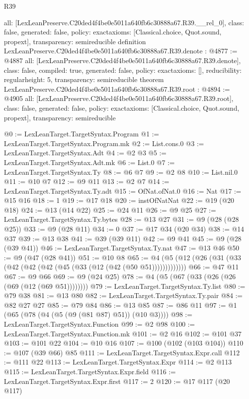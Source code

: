 \begin{lexlean}{R39}
\begin{coremodule}
{  all: [LexLeanPreserve.C20ded4f4be0e5011a640fb6c30888a67.R39.__rel_0],
  class: false,
  generated: false,
  policy: exact{axioms: [Classical.choice, Quot.sound, propext]},
  transparency: semireducible
}
definition LexLeanPreserve.C20ded4f4be0e5011a640fb6c30888a67.R39.denote : @4877 := @4887 {
  all: [LexLeanPreserve.C20ded4f4be0e5011a640fb6c30888a67.R39.denote],
  class: false,
  compiled: true,
  generated: false,
  policy: exact{axioms: []},
  reducibility: regular{height: 5},
  transparency: semireducible
}
theorem LexLeanPreserve.C20ded4f4be0e5011a640fb6c30888a67.R39.root : @4894 := @4905 {
  all: [LexLeanPreserve.C20ded4f4be0e5011a640fb6c30888a67.R39.root],
  class: false,
  generated: false,
  policy: exact{axioms: [Classical.choice, Quot.sound, propext]},
  transparency: semireducible
}

@0 := LexLeanTarget.TargetSyntax.Program
@1 := LexLeanTarget.TargetSyntax.Program.mk
@2 := List.cons.{0}
@3 := LexLeanTarget.TargetSyntax.Adt
@4 := @2 @3
@5 := LexLeanTarget.TargetSyntax.Adt.mk
@6 := List.{0}
@7 := LexLeanTarget.TargetSyntax.Ty
@8 := @6 @7
@9 := @2 @8
@10 := List.nil.{0}
@11 := @10 @7
@12 := @9 @11
@13 := @2 @7
@14 := LexLeanTarget.TargetSyntax.Ty.adt
@15 := OfNat.ofNat.{0}
@16 := Nat
@17 := @15 @16
@18 := 1
@19 := @17 @18
@20 := instOfNatNat
@22 := @19 (@20 @18)
@24 := @13 (@14 @22)
@25 := @24 @11
@26 := @9 @25
@27 := LexLeanTarget.TargetSyntax.Ty.bytes
@28 := @13 @27
@31 := @9 (@28 (@28 @25))
@33 := @9 (@28 @11)
@34 := 0
@37 := @17 @34 (@20 @34)
@38 := @14 @37
@39 := @13 @38
@41 := @39 (@39 @11)
@42 := @9 @41
@45 := @9 (@28 (@39 @41))
@46 := LexLeanTarget.TargetSyntax.Ty.nat
@47 := @13 @46
@50 := @9 (@47 (@28 @41))
@51 := @10 @8
@65 := @4 (@5 (@12 (@26 (@31 (@33 (@42 (@42 (@42 (@45 (@33 (@12 (@42 (@50 @51)))))))))))))
@66 := @47 @11
@67 := @9 @66
@69 := @9 (@24 @25)
@78 := @4 (@5 (@67 (@33 (@26 (@26 (@69 (@12 (@69 @51))))))))
@79 := LexLeanTarget.TargetSyntax.Ty.list
@80 := @79 @38
@81 := @13 @80
@82 := LexLeanTarget.TargetSyntax.Ty.pair
@84 := @82 @27 @27
@85 := @79 @84
@86 := @13 @85
@87 := @86 @11
@97 := @1 (@65 (@78 (@4 (@5 (@9 (@81 @87) @51)) (@10 @3))))
@98 := LexLeanTarget.TargetSyntax.Function
@99 := @2 @98
@100 := LexLeanTarget.TargetSyntax.Function.mk
@101 := @2 @16
@102 := @101 @37
@103 := @101 @22
@104 := @10 @16
@107 := @100 (@102 (@103 @104))
@110 := @107 (@39 @66) @85
@111 := LexLeanTarget.TargetSyntax.Expr.call
@112 := @111 @22
@113 := LexLeanTarget.TargetSyntax.Expr
@114 := @2 @113
@115 := LexLeanTarget.TargetSyntax.Expr.field
@116 := LexLeanTarget.TargetSyntax.Expr.first
@117 := 2
@120 := @17 @117 (@20 @117)

\end{coremodule}
\end{lexlean}
